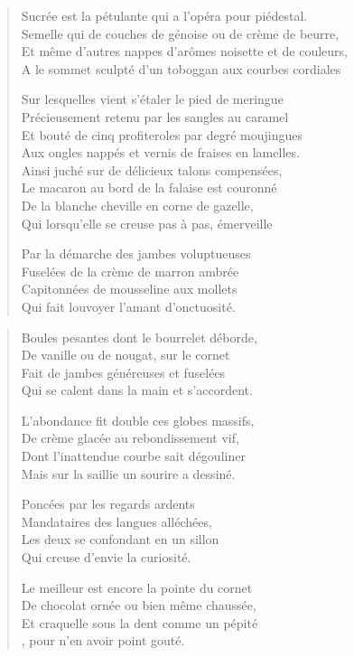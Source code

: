 \begin{verse}

Sucrée est la pétulante qui a l’opéra pour piédestal.\\
Semelle qui de couches de génoise ou de crème de beurre,\\
Et même d’autres nappes d’arômes noisette et de couleurs,\\
A le sommet sculpté d’un toboggan aux courbes cordiales

Sur lesquelles vient s’étaler le pied de meringue\\
Précieusement retenu par les sangles au caramel\\
Et bouté de cinq profiteroles par degré moujingues\\
Aux ongles nappés et vernis de fraises en lamelles.\\

Ainsi juché sur de délicieux talons compensées,\\
Le macaron au bord de la falaise est couronné\\
De la blanche cheville en corne de gazelle,\\
Qui lorsqu’elle se creuse pas à pas, émerveille

Par la démarche des jambes voluptueuses\\
Fuselées de la crème de marron ambrée\\
Capitonnées de mousseline aux mollets\\
Qui fait louvoyer l’amant d’onctuosité.
\end{verse}

\begin{verse}
Boules pesantes dont le bourrelet déborde,\\
De vanille ou de nougat, sur le cornet\\
Fait de jambes généreuses et fuselées\\
Qui se calent dans la main et s’accordent.

L’abondance fit double ces globes massifs,\\
De crème glacée au rebondissement vif,\\
Dont l’inattendue courbe sait dégouliner\\
Mais sur la saillie un sourire a dessiné.

Poncées par les regards ardents\\
Mandataires des langues alléchées,\\
Les deux se confondant en un sillon\\
Qui creuse d’envie la curiosité.

Le meilleur est encore la pointe du cornet\\
De chocolat ornée ou bien même chaussée,\\
Et craquelle sous la dent comme un pépité\\
, pour n’en avoir point gouté.
\end{verse}


